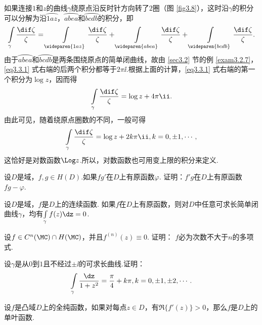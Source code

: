 \noindent 如果连接$1$和$z$的曲线$\gamma$绕原点沿反时针方向转了$2$圈（图 \ref{fig3.8}），这时沿$\gamma$的积分可以分解为沿$\wideparen{1az}$，$\wideparen{abea}$和$\wideparen{bcdb}$的积分，即
\begin{equation}\label{eq3.3.1}
\int\limits_\gamma\frac{\dif \zeta}{\zeta}
=\int\limits_{\wideparen{1az}}\frac{\dif \zeta}{\zeta}+\int\limits_{\wideparen{abea}}\frac{\dif \zeta}{\zeta}+\int\limits_{\wideparen{bcdb}}\frac{\dif \zeta}{\zeta}.
\end{equation}
由于$\wideparen{abea}$和$\wideparen{bcdb}$是两条围绕原点的简单闭曲线，故由 \ref{sec3.2} 节的例 \ref{exam3.2.7}，\eqref{eq3.3.1} 式右端的后两个积分都等于$2\pi\ii$.根据上面的计算，\eqref{eq3.3.1} 式右端的第一个积分为$\log z$，因而得
\[\int\limits_\gamma\frac{\dif \zeta}\zeta=\log z+4\pi\ii.\]
由此可见，随着绕原点圈数的不同，一般可得
\[\int\limits_\gamma\frac{\dif \zeta}\zeta=\log z+2k\pi\ii,k=0,\pm1,\cdots,\]
这恰好是对数函数$\Log z$.所以，对数函数也可用变上限的积分来定义.
\begin{xiti}
\item 设$D$是域，$f,g\in H(D)$.如果$fg'$在$D$上有原函数$\varphi$. 证明：$f'g$在$D$上有原函数$fg-\varphi$.
\item 设$D$是域，$f$是$D$上的连续函数. 如果$f$在$D$上有原函数，则对$D$中任意可求长简单闭曲线$\gamma$，均有$\int\limits_\gamma f(z)\dz=0$.
\item 设$f\in C^n(\MC)\cap H(\MC)$，并且$f^{(n)}(z)\equiv0$. 证明： $f$必为次数不大于$n$的多项式.
\item 设$\gamma$是从$0$到$1$且不经过$\pm\ii$的可求长曲线.证明：
\[\int\limits_\gamma\frac{\dz}{1+z^2}=\frac\pi4+k\pi,k=0,\pm1,\pm2,\cdots.\]
\item 设$f$是凸域$D$上的全纯函数，如果对每点$z\in D$，有$\Re \{f'(z)\}>0$，那么$f$是$D$上的单叶函数.
\end{xiti}

